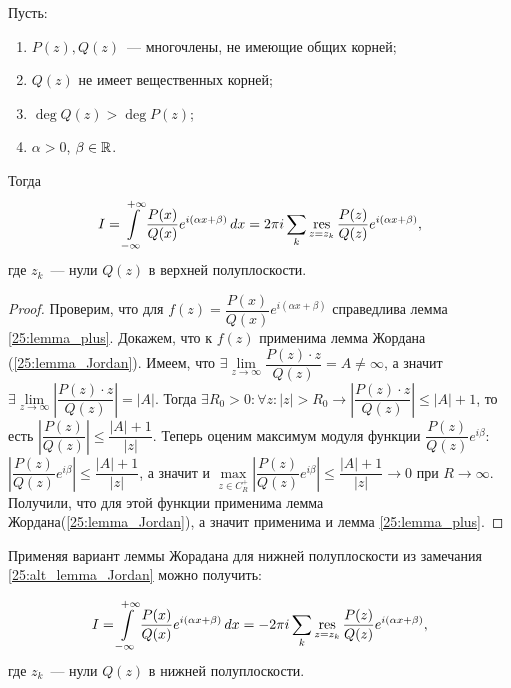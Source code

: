 \begin{statement}
Пусть:
\begin{enumerate}[wide=20pt, label=\arabic*., itemsep=0ex]
\item \(P(z), Q(z)\)~--- многочлены, не имеющие общих корней;
\item \(Q(z)\) не имеет вещественных корней;
\item \(\deg{Q(z)} > \deg{P(z)}\);
\item \(\alpha > 0\), \(\beta \in \mathbb{R}\).
\end{enumerate}

Тогда
\begin{equation} \label{25_eq:int_f_exp_up}
    I = \int\limits_{-\infty}^{+\infty} \dfrac{P(x)}{Q(x)} e^{i (\alpha x + \beta)} \, dx = 2 \pi i 
    \sum\limits_k \operatorname*{res}\limits_{z = z_k} \dfrac{P(z)}{Q(z)} e^{i (\alpha x + \beta)},
\end{equation}
где \(z_k\)~--- нули \(Q(z)\) в верхней полуплоскости. 
\end{statement}

\begin{proof}
Проверим, что для \(f(z) = \dfrac{P(x)}{Q(x)} e^{i (\alpha x + \beta)}\) справедлива лемма 
\ref{25:lemma_plus}. Докажем, что к \(f(z)\) применима лемма Жордана (\ref{25:lemma_Jordan}). Имеем,
что \(\exists \lim\limits_{z \to \infty} 
\dfrac{P(z)\cdot z}{Q(z)} = A \ne \infty\), а значит \(\exists \lim\limits_{z \to \infty} 
\left|\dfrac{P(z)\cdot z}{Q(z)}\right| = |A|\). Тогда \(\exists R_0 > 0 \colon \forall z \colon 
|z| > R_0 \to \left|\dfrac{P(z)\cdot z}{Q(z)}\right| \le |A| + 1\), то есть 
\(\left|\dfrac{P(z)}{Q(z)}\right| \le \dfrac{|A| + 1}{|z|}\). Теперь оценим максимум модуля функции 
\(\dfrac{P(z)}{Q(z)} e^{i \beta}\): \(\left|\dfrac{P(z)}{Q(z)} e^{i \beta}\right| \le 
\dfrac{|A| + 1}{|z|}\), а значит и \(\max\limits_{z \in C_R^+} \left|\dfrac{P(z)}{Q(z)} 
e^{i \beta}\right| \le \dfrac{|A| + 1}{|z|} \to 0\) при \(R \to \infty\).
Получили, что для этой функции применима лемма Жордана(\ref{25:lemma_Jordan}), а значит применима и
лемма \ref{25:lemma_plus}.
\end{proof}

\begin{note}
Применяя вариант леммы Жорадана для нижней полуплоскости из замечания \ref{25:alt_lemma_Jordan}
можно получить:

\begin{equation} \label{25_eq:int_f_exp_down}
    I = \int\limits_{-\infty}^{+\infty} \dfrac{P(x)}{Q(x)} e^{i (\alpha x + \beta)} \, dx = -2 \pi i 
    \sum\limits_k \operatorname*{res}\limits_{z = z_k} \dfrac{P(z)}{Q(z)} e^{i (\alpha x + \beta)},
\end{equation}
где \(z_k\)~--- нули \(Q(z)\) в нижней полуплоскости. 
\end{note}

